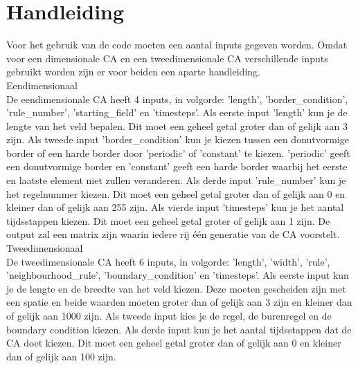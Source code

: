 \documentclass[12pt,a4paper]{article}
\begin{document}
\section*{Handleiding}
Voor het gebruik van de code moeten een aantal inputs gegeven worden. Omdat voor een dimensionale CA en een tweedimensionale CA verschillende inputs gebruikt worden zijn er voor beiden een aparte handleiding. \\
\newline\large{Eendimensionaal} \\
\newline\normalsize De eendimensionale CA heeft 4 inputs, in volgorde: 'length', 'border\_condition', 'rule\_number', 'starting\_field' en 'timesteps'. Als eerste input 'length' kun je de lengte van het veld bepalen. Dit moet een geheel getal groter dan of gelijk aan 3 zijn. Als tweede input 'border\_condition' kun je kiezen tussen een donutvormige border of een harde border door 'periodic' of 'constant' te kiezen. 'periodic' geeft een donutvormige border en 'constant' geeft een harde border waarbij het eerste en laatste element niet zullen veranderen. Als derde input 'rule\_number' kun je het regelnummer kiezen. Dit moet een geheel getal groter dan of gelijk aan 0 en kleiner dan of gelijk aan 255 zijn. Als vierde input 'timesteps' kun je het aantal tijdsstappen kiezen. Dit moet een geheel getal groter of gelijk aan 1 zijn. De output zal een matrix zijn waarin iedere rij één generatie van de CA voorstelt.\\
\newline\large{Tweedimensionaal} \\
\newline\normalsize De tweedimensionale CA heeft 6 inputs, in volgorde: 'length', 'width', 'rule', 'neighbourhood\_rule', 'boundary\_condition' en 'timesteps'. Als eerste input kun je de lengte en de breedte van het veld kiezen. Deze moeten gescheiden zijn met een spatie en beide waarden moeten groter dan of gelijk aan 3 zijn en kleiner dan of gelijk aan 1000 zijn. Als tweede input kies je de regel, de burenregel en de boundary condition kiezen. Als derde input kun je het aantal tijdsstappen dat de CA doet kiezen. Dit moet een geheel getal groter dan of gelijk aan 0 en kleiner dan of gelijk aan 100 zijn.
\end{document}
